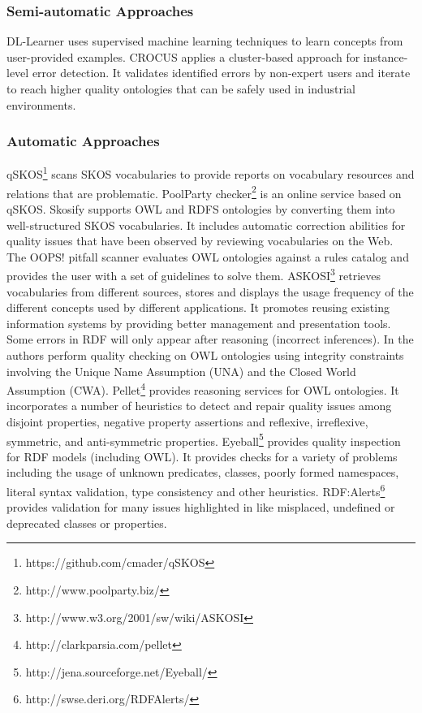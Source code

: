 \documentclass[onecolumn, crcready]{iosart2c}
\begin{document}
\subsubsection{Semi-automatic Approaches}

DL-Learner \cite{Lehmann_dl-learner:learning} uses supervised machine learning techniques to learn concepts from user-provided examples. CROCUS \cite{wasabi_crocus} applies a cluster-based approach for instance-level error detection. It validates identified errors by non-expert users and iterate to reach higher quality ontologies that can be safely used in industrial environments.

\subsubsection{Automatic Approaches}

qSKOS\footnote{https://github.com/cmader/qSKOS} \cite{Mader2012} scans SKOS vocabularies to provide reports on vocabulary resources and relations that are problematic. PoolParty checker\footnote{http://www.poolparty.biz/} is an online service based on qSKOS. Skosify \cite{Suominen:2012:IQS:2413941.2413985} supports OWL and RDFS ontologies by converting them into well-structured SKOS vocabularies. It includes automatic correction abilities for quality issues that have been observed by reviewing vocabularies on the Web. The OOPS! pitfall scanner \cite{oops} evaluates OWL ontologies against a rules catalog and provides the user with a set of guidelines to solve them. ASKOSI\footnote{http://www.w3.org/2001/sw/wiki/ASKOSI} retrieves vocabularies from different sources, stores and displays the usage frequency of the different concepts used by different applications. It promotes reusing existing information systems by providing better management and presentation tools.\\ Some errors in RDF will only appear after reasoning (incorrect inferences). In \cite{conf/owled/SirinSW08}\cite{conf/hicss/TaoDM09} the authors perform quality checking on OWL ontologies using integrity constraints involving the Unique Name Assumption (UNA) and the Closed World Assumption (CWA). Pellet\footnote{http://clarkparsia.com/pellet} provides reasoning services for OWL ontologies. It incorporates a number of heuristics to detect and repair quality issues among disjoint properties, negative property assertions and reflexive, irreflexive, symmetric, and anti-symmetric properties. Eyeball\footnote{http://jena.sourceforge.net/Eyeball/} provides quality inspection for RDF models (including OWL). It provides checks for a variety of problems including the usage of unknown predicates, classes, poorly formed namespaces, literal syntax validation, type consistency and other heuristics. RDF:Alerts\footnote{http://swse.deri.org/RDFAlerts/} provides validation for many issues highlighted in \cite{Hogan2010} like misplaced, undefined or deprecated classes or properties.\\
\end{document}
